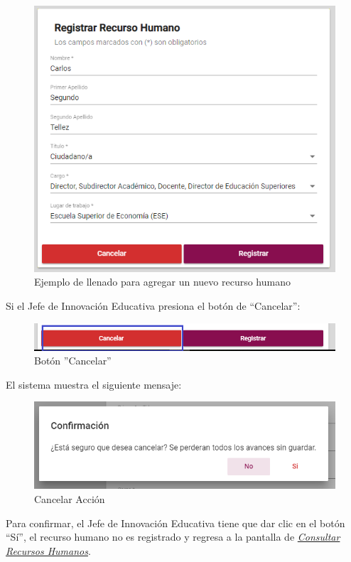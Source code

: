             \begin{figure}[H]
                \centering
                \hypertarget{ejreg}{\includegraphics[width=0.7\linewidth]{images/SP1/RegistrarLleno}}
                \caption{Ejemplo de llenado para agregar un nuevo recurso humano}
                \label{ejreg}
            \end{figure}

    \newpage
            Si el Jefe de Innovación Educativa presiona el botón de “Cancelar”:

            \begin{figure}[H]
                \centering
                \hypertarget{cancel1}{\includegraphics[width=0.7\linewidth]{images/SP1/BtnCancelar1}}
                \caption{Botón ''Cancelar''}
                \label{cancel1}
            \end{figure}

            El sistema muestra el siguiente mensaje:


             \begin{figure}[H]
                \centering
            \includegraphics[width=0.4\linewidth]{images/SP1/MSG29}
                \caption{Cancelar Acción}
                \label{mensaje29}
            \end{figure}

            Para confirmar, el Jefe de Innovación Educativa tiene que dar clic en el botón “Sí”, el recurso humano no es registrado y regresa a la pantalla de \hyperlink{consultarRH}{\textit{Consultar Recursos Humanos}}.

